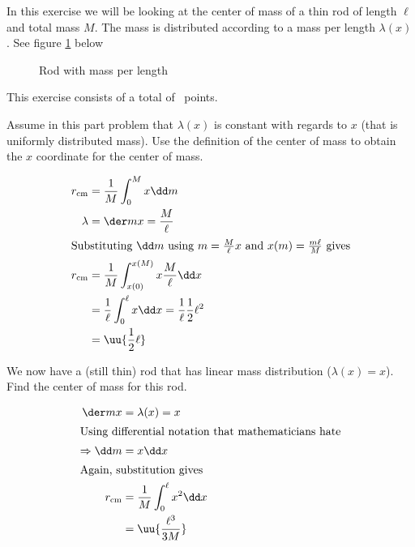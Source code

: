 \begin{intro}
	In this exercise we will be looking at the center of mass of a thin rod of length \( \ell \) and total mass \( M \). The mass is distributed according to a mass per length \( \lambda(x) \). See figure \ref{fig:mechanics-rod} below
	\begin{figure}[h]
		\centering
		
		\caption{Rod with mass per length \label{fig:mechanics-rod}}
	\end{figure}
	This exercise consists of a total of \exercisepoints\ points.
\end{intro}
\begin{problem}
	Assume in this part problem that \( \lambda(x) \) is constant with regards to \( x \) (that is uniformly distributed mass).
	Use the definition of the center of mass to obtain the \( x \) coordinate for the center of mass.
\end{problem}
\begin{solution}
	\begin{align*}
		r_{\text{cm}} &=\frac1M\int_{0}^{M}x\dd m                               \\
		\lambda       &= \der mx = \frac M\ell                                  \\
		\intertext{Substituting $\dd m$ using $m=\frac M\ell x$ and $x(m)=\frac{m\ell}{M}$ gives}
		r_{\text{cm}} &=\frac{1}{M}\int_{x(0)}^{x(M)}x\frac M\ell\dd x          \\
		              &=\frac1\ell\int_{0}^{\ell}x\dd x=\frac1\ell\frac12\ell^2 \\
		              &=\uu{\frac12\ell}
	\end{align*}
\end{solution}
\begin{problem}
	We now have a (still thin) rod that has linear mass distribution (\( \lambda(x)=x \)).
	Find the center of mass for this rod.
\end{problem}
\begin{solution}
	\begin{align*}
		\der mx           &=\lambda(x)=x                   \\
		\intertext{Using differential notation that mathematicians hate}
		\Rightarrow \dd m &=x\dd x                         \\
		\intertext{Again, substitution gives}
		r_{\text{cm}}     &=\frac1M\int_{0}^{\ell}x^2\dd x \\
		                  &= \uu{\frac{\ell^3}{3M}}
	\end{align*}
\end{solution}
